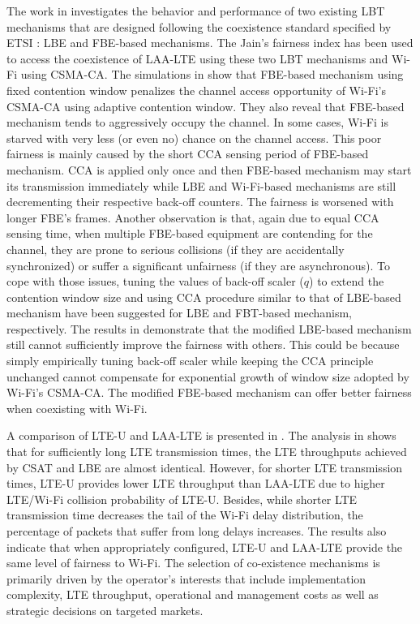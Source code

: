 \documentclass[journal,draftclsnofoot,12pt,onecolumn]{IEEEtran}
\begin{document}
The work in \cite{Enhanced-LTE-U-thesis-2015} investigates the behavior and performance of two existing LBT mechanisms that are designed following the coexistence standard specified by ETSI \cite{LBT-ETSI-2014}: LBE and FBE-based mechanisms. The Jain's fairness index has been used to access the coexistence of LAA-LTE using these two LBT mechanisms and Wi-Fi using CSMA-CA. The simulations in \cite{Enhanced-LTE-U-thesis-2015} show that FBE-based mechanism using fixed contention window penalizes the channel access opportunity of Wi-Fi's CSMA-CA using adaptive contention window. They also reveal that FBE-based mechanism tends to aggressively occupy the channel. In some cases, Wi-Fi is starved with very less (or even no) chance on the channel access. This poor fairness is mainly caused by the short CCA sensing period of FBE-based mechanism. CCA is applied only once and then FBE-based mechanism may start its transmission immediately while LBE and Wi-Fi-based mechanisms are still decrementing their respective back-off counters. The fairness is worsened with longer FBE's frames. Another observation is that, again due to equal CCA sensing time, when multiple FBE-based equipment are contending for the channel, they are prone to serious collisions (if they are accidentally synchronized) or suffer a significant unfairness (if they are asynchronous). To cope with those issues, tuning the values of back-off scaler ($q$) to extend the contention window size and using CCA procedure similar to that of LBE-based mechanism have been suggested for LBE and FBT-based mechanism, respectively. The results in \cite{Enhanced-LTE-U-thesis-2015} demonstrate that the modified LBE-based mechanism still cannot sufficiently improve the fairness with others. This could be because simply empirically tuning back-off scaler while keeping the CCA principle unchanged cannot compensate for exponential growth of window size adopted by Wi-Fi's CSMA-CA. The modified FBE-based mechanism can offer better fairness when coexisting with Wi-Fi.

A comparison of LTE-U and LAA-LTE is presented in \cite{LBT-CSAT-2015}. The analysis in \cite{LBT-CSAT-2015} shows that for sufficiently long LTE transmission times, the LTE throughputs achieved by CSAT and LBE are almost identical. However, for shorter LTE transmission times, LTE-U provides lower LTE throughput than LAA-LTE due to higher LTE/Wi-Fi collision probability of LTE-U. Besides, while shorter LTE transmission time decreases the tail of the Wi-Fi delay distribution, the percentage of packets that suffer from long delays increases. The results also indicate that when appropriately configured, LTE-U and LAA-LTE provide the same level of fairness to Wi-Fi. The selection of co-existence mechanisms is primarily driven by the operator's interests that include implementation complexity, LTE throughput, operational and management costs as well as strategic decisions on targeted markets.
\end{document}
